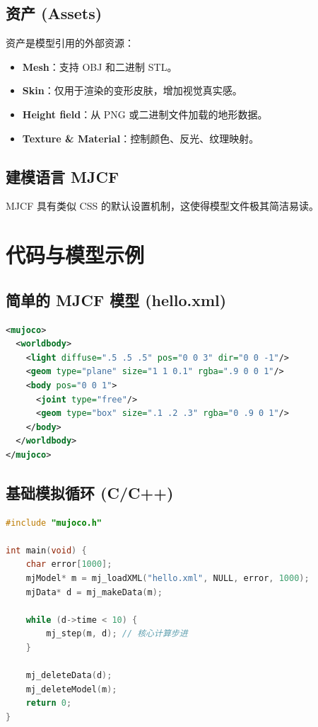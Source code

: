 \documentclass[11pt,a4paper]{book}
\begin{document}
\subsection{资产 (Assets)}
资产是模型引用的外部资源：
\begin{itemize}
    \item \textbf{Mesh}：支持 OBJ 和二进制 STL。
    \item \textbf{Skin}：仅用于渲染的变形皮肤，增加视觉真实感。
    \item \textbf{Height field}：从 PNG 或二进制文件加载的地形数据。
    \item \textbf{Texture \& Material}：控制颜色、反光、纹理映射。
\end{itemize}

\subsection{建模语言 MJCF}
MJCF 具有类似 CSS 的默认设置机制，这使得模型文件极其简洁易读。

\section{代码与模型示例}

\subsection{简单的 MJCF 模型 (hello.xml)}
\begin{lstlisting}[language=XML]
<mujoco>
  <worldbody>
    <light diffuse=".5 .5 .5" pos="0 0 3" dir="0 0 -1"/>
    <geom type="plane" size="1 1 0.1" rgba=".9 0 0 1"/>
    <body pos="0 0 1">
      <joint type="free"/>
      <geom type="box" size=".1 .2 .3" rgba="0 .9 0 1"/>
    </body>
  </worldbody>
</mujoco>
\end{lstlisting}

\subsection{基础模拟循环 (C/C++)}
\begin{lstlisting}[language=C]
#include "mujoco.h"

int main(void) {
    char error[1000];
    mjModel* m = mj_loadXML("hello.xml", NULL, error, 1000);
    mjData* d = mj_makeData(m);

    while (d->time < 10) {
        mj_step(m, d); // 核心计算步进
    }

    mj_deleteData(d);
    mj_deleteModel(m);
    return 0;
}
\end{lstlisting}
\end{document}
